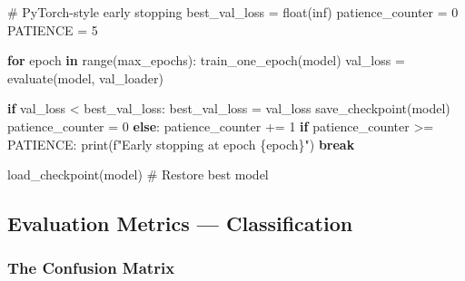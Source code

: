 \documentclass[11pt]{article}
\newenvironment{Shaded}{\begin{snugshade}}{\end{snugshade}}
\newcommand{\BuiltInTok}[1]{\textcolor[rgb]{0.50,0.55,0.55}{#1}}
\newcommand{\CommentTok}[1]{\textcolor[rgb]{0.48,0.49,0.49}{#1}}
\newcommand{\ControlFlowTok}[1]{\textcolor[rgb]{0.99,0.74,0.29}{\textbf{#1}}}
\newcommand{\DecValTok}[1]{\textcolor[rgb]{0.96,0.45,0.00}{#1}}
\newcommand{\KeywordTok}[1]{\textcolor[rgb]{0.81,0.81,0.76}{\textbf{#1}}}
\newcommand{\NormalTok}[1]{\textcolor[rgb]{0.81,0.81,0.76}{#1}}
\newcommand{\OperatorTok}[1]{\textcolor[rgb]{0.81,0.81,0.76}{#1}}
\newcommand{\SpecialCharTok}[1]{\textcolor[rgb]{0.24,0.68,0.91}{#1}}
\newcommand{\SpecialStringTok}[1]{\textcolor[rgb]{0.85,0.27,0.33}{#1}}
\newcommand{\StringTok}[1]{\textcolor[rgb]{0.96,0.31,0.31}{#1}}
\begin{document}

\begin{Shaded}
\begin{Highlighting}[]
\CommentTok{\# PyTorch{-}style early stopping}
\NormalTok{best\_val\_loss }\OperatorTok{=} \BuiltInTok{float}\NormalTok{(}\StringTok{\textquotesingle{}inf\textquotesingle{}}\NormalTok{)}
\NormalTok{patience\_counter }\OperatorTok{=} \DecValTok{0}
\NormalTok{PATIENCE }\OperatorTok{=} \DecValTok{5}

\ControlFlowTok{for}\NormalTok{ epoch }\KeywordTok{in} \BuiltInTok{range}\NormalTok{(max\_epochs):}
\NormalTok{    train\_one\_epoch(model)}
\NormalTok{    val\_loss }\OperatorTok{=}\NormalTok{ evaluate(model, val\_loader)}
    
    \ControlFlowTok{if}\NormalTok{ val\_loss }\OperatorTok{\textless{}}\NormalTok{ best\_val\_loss:}
\NormalTok{        best\_val\_loss }\OperatorTok{=}\NormalTok{ val\_loss}
\NormalTok{        save\_checkpoint(model)}
\NormalTok{        patience\_counter }\OperatorTok{=} \DecValTok{0}
    \ControlFlowTok{else}\NormalTok{:}
\NormalTok{        patience\_counter }\OperatorTok{+=} \DecValTok{1}
        \ControlFlowTok{if}\NormalTok{ patience\_counter }\OperatorTok{\textgreater{}=}\NormalTok{ PATIENCE:}
            \BuiltInTok{print}\NormalTok{(}\SpecialStringTok{f"Early stopping at epoch }\SpecialCharTok{\{}\NormalTok{epoch}\SpecialCharTok{\}}\SpecialStringTok{"}\NormalTok{)}
            \ControlFlowTok{break}

\NormalTok{load\_checkpoint(model)  }\CommentTok{\# Restore best model}
\end{Highlighting}
\end{Shaded}

\subsection{Evaluation Metrics --- Classification}\label{evaluation-metrics--classification}

\subsubsection{The Confusion Matrix}\label{the-confusion-matrix}

\end{document}
